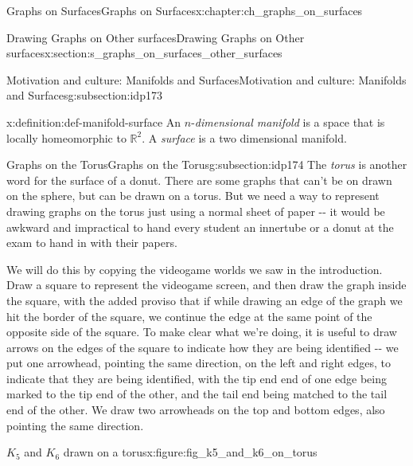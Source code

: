 \documentclass[oneside,10pt,]{book}
\numberwithin{equation}{section}
\newcommand{\reals}{\mathbb{R}}
\begin{document}
\begin{chapterptx}{Graphs on Surfaces}{}{Graphs on Surfaces}{}{}{x:chapter:ch_graphs_on_surfaces}
\begin{sectionptx}{Drawing Graphs on Other surfaces}{}{Drawing Graphs on Other surfaces}{}{}{x:section:s_graphs_on_surfaces_other_surfaces}
\begin{subsectionptx}{Motivation and culture: Manifolds and Surfaces}{}{Motivation and culture: Manifolds and Surfaces}{}{}{g:subsection:idp173}
\begin{definition}{}{x:definition:def-manifold-surface}
An \(n\)-\emph{dimensional manifold} is a space that is locally homeomorphic to \(\reals^2\).  A \emph{surface} is a two dimensional manifold.%
\end{definition}
\end{subsectionptx}
%
%
\typeout{************************************************}
\typeout{************************************************}
%
\begin{subsectionptx}{Graphs on the Torus}{}{Graphs on the Torus}{}{}{g:subsection:idp174}
The \emph{torus} is another word for the surface of a donut.  There are some graphs that can't be on drawn on the sphere, but can be drawn on a torus.  But we need a way to represent drawing graphs on the torus just using a normal sheet of paper -{}-{} it would be awkward and impractical to hand every student an innertube or a donut at the exam to hand in with their papers.%
\par
We will do this by copying the videogame worlds we saw in the introduction.  Draw a square to represent the videogame screen, and then draw the graph inside the square, with the added proviso that if while drawing an edge of the graph we hit the border of the square, we continue the edge at the same point of the opposite side of the square.  To make clear what we're doing, it is useful to draw arrows on the edges of the square to indicate how they are being identified -{}-{} we put one arrowhead, pointing the same direction, on the left and right edges, to indicate that they are being identified, with the tip end end of one edge being marked to the tip end of the other, and the tail end being matched to the tail end of the other.  We draw two arrowheads on the top and bottom edges, also pointing the same direction.%
\begin{figureptx}{\(K_5\) and \(K_6\)  drawn on a torus}{x:figure:fig_k5_and_k6_on_torus}{}%
\begin{image}{0}{1}{0}%
\end{image}
\end{figureptx}
\end{subsectionptx}
\end{sectionptx}
\end{chapterptx}
\end{document}
